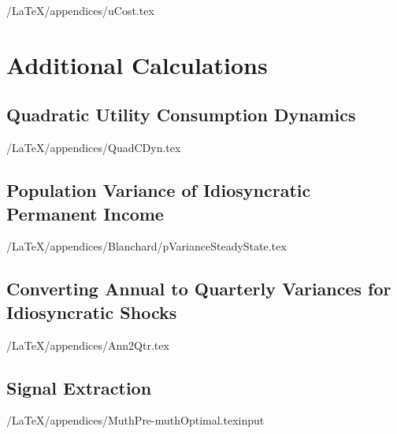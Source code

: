 \documentclass[titlepage]{\econtex}\newcommand{\texname}{cAndCwithStickyE}
\begin{document}
\econtexRoot/LaTeX/appendices/uCost.tex




\section{Additional Calculations}

\subsection{Quadratic Utility Consumption Dynamics}\label{appendix:QuadCDyn}

\econtexRoot/LaTeX/appendices/QuadCDyn.tex




%


\subsection{Population Variance of Idiosyncratic Permanent Income}\label{appendix:pss}

\econtexRoot/LaTeX/appendices/Blanchard/pVarianceSteadyState.tex

\subsection{Converting Annual to Quarterly Variances for Idiosyncratic Shocks}\label{appendix:Ann2Qtr}

\econtexRoot/LaTeX/appendices/Ann2Qtr.tex

\subsection{\cite{muthOptimal} Signal Extraction}\label{appendix:Muth}

\econtexRoot/LaTeX/appendices/MuthPre-muthOptimal.texinput
\end{document}
